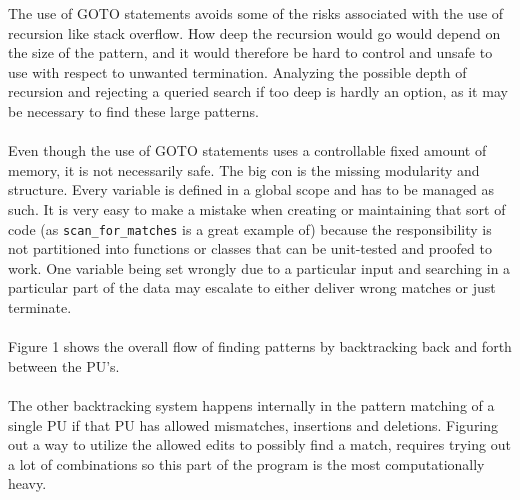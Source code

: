 \documentclass[12pt]{article}
\newcommand{\scm}{\texttt{scan\_for\_matches} }
\newcommand{\pu}{PU }
\begin{document}
\noindent The use of GOTO statements avoids some of the risks associated with the use of recursion like stack overflow. 
How deep the recursion would go would depend on the size of the pattern, and it would therefore be hard to control and
unsafe to use with respect to unwanted termination. Analyzing the possible depth of recursion and rejecting a queried search
if too deep is hardly an option, as it may be necessary to find these large patterns. \\ \\
Even though the use of GOTO statements uses a controllable fixed amount of
memory, it is not necessarily safe. The big con is the missing modularity and structure. Every variable is defined in a
global scope and has to be managed as such. It is very easy to make a mistake when creating or maintaining that sort of code
(as \scm is a great example of)
because the responsibility is not partitioned into functions or classes that can be unit-tested and proofed to work.
One variable being set wrongly due to a particular input and searching in a particular part of the data may 
escalate to either deliver wrong matches or just terminate. \\ \\
Figure 1 shows the overall flow of finding patterns by backtracking back and forth between the PU's. \\ \\
The other backtracking system happens internally in the pattern matching of a single \pu if that \pu has allowed
mismatches, insertions and deletions. Figuring out a way to utilize the allowed edits to possibly find a match, requires
trying out a lot of combinations so this part of the program is the most computationally heavy. 
\end{document}
